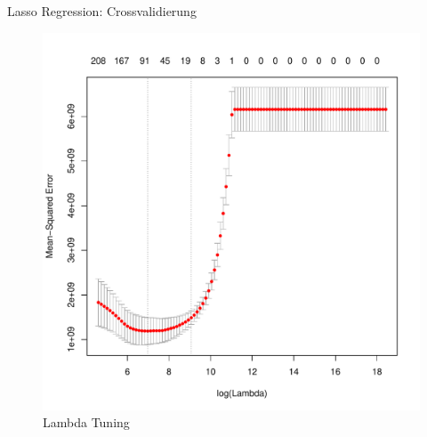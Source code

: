\documentclass[10pt]{beamer}
\begin{document}
\begin{frame}{Lasso Regression: Crossvalidierung}
	
	\begin{figure}
		\centering
		\includegraphics[height=.7\textheight]{figures/lasso_cv.pdf}
		\caption{Lambda Tuning}
	\end{figure}
	
\end{frame}
\end{document}
